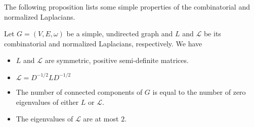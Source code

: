 The following proposition lists some simple properties of the
combinatorial and normalized Laplacians. 
\begin{proposition}
  \label{prop:1}
  Let $G = (V,E,\omega)$ be a simple, undirected graph and $L$ and
  $\mathcal{L}$ be its combinatorial and normalized Laplacians,
  respectively. We have
  \begin{itemize}
  \item $L$ and $\mathcal{L}$ are symmetric, positive
    semi-definite matrices.
  \item $\mathcal{L} = D^{-1/2} L D^{-1/2}$
  \item The number of connected components of $G$ is equal to the
    number of zero eigenvalues of either $L$ or $\mathcal{L}$.
  \item The eigenvalues of $\mathcal{L}$ are at most $2$. 
  \end{itemize}
\end{proposition}
